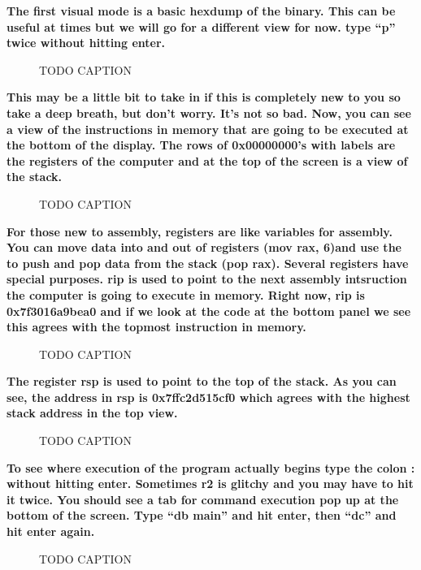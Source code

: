 \documentclass[letterpaper]{article}
\newcommand{\sitfig}[3]{
\begin{figure}[H]
\centering
\makebox[\textwidth][c]{
#2
}
\caption{#3}
\label{#1}
\end{figure}
}
\newcommand{\sitgfx}[4][scale=1.0]{
\sitfig{#3}{\texttt{[image: \#2]}}{#4}
}
\begin{document}
\textbf{The first visual mode is a basic hexdump of the binary. This can be useful at times but we will go for a
different view for now. type ``p'' twice without hitting enter.}

  
\sitgfx[width=5.8335in,height=3.6457in]{FINALWORKINGDOCFORMERLYPRECURSOR-img077.png}{fig:unk}{TODO CAPTION}
 

\textbf{This may be a little bit to take in if this is completely new to you so take a deep breath, but don't worry.
It's not so bad. Now, you can see a view of the instructions in memory that are going to be executed at the bottom of
the display. The rows of 0x00000000's with labels are the registers of the computer and at the top of the screen is a
view of the stack.}

  
\sitgfx[width=5.8335in,height=3.6457in]{FINALWORKINGDOCFORMERLYPRECURSOR-img027.png}{fig:unk}{TODO CAPTION}
 

\textbf{For those new to assembly, registers are like variables for assembly. You can move data into and out of
registers (mov rax, 6)and use the to push and pop data from the stack (pop rax). Several registers have special
purposes. rip is used to point to the next assembly intsruction the computer is going to execute in memory. Right now,
rip is 0x7f3016a9bea0 and if we look at the code at the bottom panel we see this agrees with the topmost instruction in
memory.}

  
\sitgfx[width=5.8335in,height=3.6457in]{FINALWORKINGDOCFORMERLYPRECURSOR-img078.png}{fig:unk}{TODO CAPTION}
 

\textbf{The register rsp is used to point to the top of the stack. As you can see, the address in rsp is 0x7ffc2d515cf0
which agrees with the highest stack address in the top view.}

  
\sitgfx[width=5.8335in,height=3.6457in]{FINALWORKINGDOCFORMERLYPRECURSOR-img079.png}{fig:unk}{TODO CAPTION}
 

\textbf{To see where execution of the program actually begins type the colon : without hitting enter. Sometimes r2 is
glitchy and you may have to hit it twice. You should see a tab for command execution pop up at the bottom of the
screen. Type ``db main'' and hit enter, then ``dc'' and hit enter again.}

  
\sitgfx[width=5.8335in,height=3.6457in]{FINALWORKINGDOCFORMERLYPRECURSOR-img080.png}{fig:unk}{TODO CAPTION}
 
\end{document}
